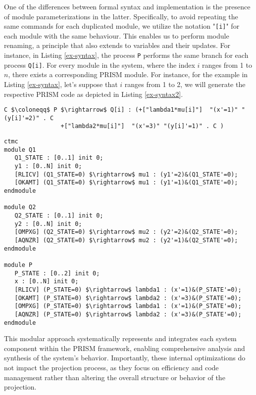 One of the differences between formal syntax and implementation is the presence of module parameterizations in the latter. Specifically, to avoid repeating the same commands for each duplicated module, we utilize the notation "\texttt{[i]}" for each module with the same behaviour.   
This enables us to perform module renaming, a principle that also extends to variables and their updates. For instance, in Listing \ref{ex-syntax}, the process \texttt{P} performs the same branch for each process \texttt{Q[i]}. %
For every module in the system, where the index 
$i$ ranges from 1 to $n$, there exists a corresponding PRISM module. For instance, for the example in Listing \ref{ex-syntax}, let's suppose that $i$ ranges  from 1 to 2, we will generate the respective PRISM code as depicted in Listing \ref{ex-syntax2}. 
\begin{lstlisting}[style=chor-color,breaklines=true, postbreak=\mbox{\textcolor{red}{$\hookrightarrow$}\space},caption={Example of an use of parameterization in the choreographic language},captionpos=b,label={ex-syntax}]
	C $\coloneqq$ P $\rightarrow$ Q[i] : (+["lambda1*mu[i]"]  "(x'=1)" "(y[i]'=2)" . C
			    +["lambda2*mu[i]"]  "(x'=3)" "(y[i]'=1)" . C )
\end{lstlisting}
\begin{lstlisting}[style=prism-color,caption={PRISM code generated for the choreography in Listing \ref{ex-syntax}},captionpos=b,label={ex-syntax2}]
ctmc
module Q1
   Q1_STATE : [0..1] init 0;
   y1 : [0..N] init 0;
   [RLICV] (Q1_STATE=0) $\rightarrow$ mu1 : (y1'=2)&(Q1_STATE'=0);
   [OKAMT] (Q1_STATE=0) $\rightarrow$ mu1 : (y1'=1)&(Q1_STATE'=0);
endmodule

module Q2
   Q2_STATE : [0..1] init 0;
   y2 : [0..N] init 0;
   [OMPXG] (Q2_STATE=0) $\rightarrow$ mu2 : (y2'=2)&(Q2_STATE'=0);
   [AQNZR] (Q2_STATE=0) $\rightarrow$ mu2 : (y2'=1)&(Q2_STATE'=0);
endmodule

module P
   P_STATE : [0..2] init 0;
   x : [0..N] init 0;
   [RLICV] (P_STATE=0) $\rightarrow$ lambda1 : (x'=1)&(P_STATE'=0);
   [OKAMT] (P_STATE=0) $\rightarrow$ lambda2 : (x'=3)&(P_STATE'=0);
   [OMPXG] (P_STATE=0) $\rightarrow$ lambda1 : (x'=1)&(P_STATE'=0);
   [AQNZR] (P_STATE=0) $\rightarrow$ lambda2 : (x'=3)&(P_STATE'=0);
endmodule
\end{lstlisting}
This modular approach systematically represents and integrates each system component within the PRISM framework, enabling comprehensive analysis and synthesis of the system's behavior. Importantly, these internal optimizations do not impact the projection process, as they focus on efficiency and code management rather than altering the overall structure or behavior of the projection. %


